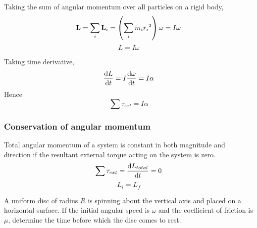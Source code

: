 Taking the sum of angular momentum over all particles on a rigid body,
\[ \vb{L} = \sum_i \vb{L}_i = \left(\sum_i m_i{r_i}^2\right)\omega = I\omega \]
\begin{equation}
L = I\omega
\end{equation}

Taking time derivative,
\[ \odv{L}{t} = I\odv{\omega}{t} = I\alpha \]
Hence
\begin{equation}
\sum\tau_{ext} = I\alpha
\end{equation}

\subsubsection{Conservation of angular momentum}
\begin{thrm}{}{}
Total angular momentum of a system is constant in both magnitude and direction if the resultant external torque acting on the system is zero.
\begin{equation}
\sum\tau_{ext} = \odv{L_{total}}{t} = 0
\end{equation}
\[ L_i = L_f \]
\end{thrm}
\pagebreak

\begin{exmp}{}{}
A uniform disc of radius $R$ is spinning about the vertical axis and placed on a horizontal surface. If the initial angular speed is $\omega$ and the coefficient of friction is $\mu$, determine the time before which the disc comes to rest.
\end{exmp}

